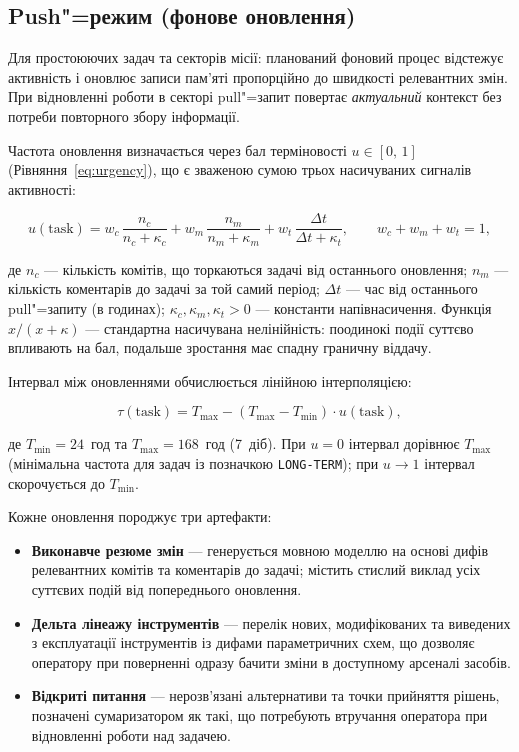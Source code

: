 \documentclass[11pt]{article}
\begin{document}
\subsection{Push"=режим (фонове оновлення)}

Для простоюючих задач та секторів місії: планований фоновий процес відстежує активність і оновлює записи пам'яті пропорційно до швидкості релевантних змін.
При відновленні роботи в секторі pull"=запит повертає \emph{актуальний} контекст без потреби повторного збору інформації.

Частота оновлення визначається через бал терміновості $u \in [0,\,1]$ (Рівняння~\ref{eq:urgency}), що є зваженою сумою трьох насичуваних сигналів активності:

\begin{equation}
  u(\text{task}) = w_c \,\frac{n_c}{n_c + \kappa_c}
                 + w_m \,\frac{n_m}{n_m + \kappa_m}
                 + w_t \,\frac{\Delta t}{\Delta t + \kappa_t},
  \qquad w_c + w_m + w_t = 1,
  \label{eq:urgency}
\end{equation}

\noindent де $n_c$ --- кількість комітів, що торкаються задачі від останнього оновлення;
$n_m$ --- кількість коментарів до задачі за той самий період;
$\Delta t$ --- час від останнього pull"=запиту (в годинах);
$\kappa_c, \kappa_m, \kappa_t > 0$ --- константи напівнасичення.
Функція $x/(x+\kappa)$ --- стандартна насичувана нелінійність: поодинокі події суттєво впливають на бал, подальше зростання має спадну граничну віддачу.

Інтервал між оновленнями обчислюється лінійною інтерполяцією:

\begin{equation}
  \tau(\text{task}) = T_{\max} - (T_{\max} - T_{\min}) \cdot u(\text{task}),
  \label{eq:refresh}
\end{equation}

\noindent де $T_{\min} = 24$~год та $T_{\max} = 168$~год (7~діб).
При $u = 0$ інтервал дорівнює $T_{\max}$ (мінімальна частота для задач із позначкою \texttt{LONG-TERM}); при $u \to 1$ інтервал скорочується до $T_{\min}$.

Кожне оновлення породжує три артефакти:

\begin{itemize}[nosep]
  \item \textbf{Виконавче резюме змін} --- генерується мовною моделлю на основі дифів релевантних комітів та коментарів до задачі; містить стислий виклад усіх суттєвих подій від попереднього оновлення.
  \item \textbf{Дельта лінеажу інструментів} --- перелік нових, модифікованих та виведених з експлуатації інструментів із дифами параметричних схем, що дозволяє оператору при поверненні одразу бачити зміни в доступному арсеналі засобів.
  \item \textbf{Відкриті питання} --- нерозв'язані альтернативи та точки прийняття рішень, позначені сумаризатором як такі, що потребують втручання оператора при відновленні роботи над задачею.
\end{itemize}
\end{document}
